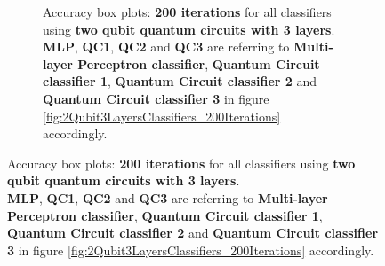 \begin{figure}[!h]
\begin{subfigure}{1.0\textwidth}
\begin{subfigure}{1.0\textwidth}
{            }
        \end{subfigure}
        \begin{subfigure}{1.0\textwidth}
            \centering
        \end{subfigure}
        \begin{subfigure}{1.0\textwidth}
            \centering
        \end{subfigure}
        \caption{Accuracy box plots: \textbf{200 iterations} for all classifiers using \textbf{two qubit quantum circuits with 3 layers}.\\ \textbf{MLP}, \textbf{QC1}, \textbf{QC2} and \textbf{QC3} are referring to \textbf{Multi-layer Perceptron classifier}, \textbf{Quantum Circuit classifier 1}, \textbf{Quantum Circuit classifier 2} and \textbf{Quantum Circuit classifier 3} in figure \ref{fig:2Qubit3LayersClassifiers_200Iterations} accordingly.}
        \label{fig:2Qubit3LayersClassifiers_200Iterations_boxplot}
    \end{subfigure}
\end{figure}


